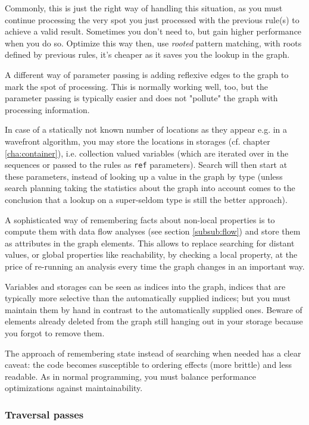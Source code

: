Commonly, this is just the right way of handling this situation, 
as you must continue processing the very spot you just processed with the previous rule(s) to achieve a valid result.
Sometimes you don't need to, but gain higher performance when you do so.
Optimize this way then, use \emph{rooted} pattern matching, with roots defined by previous rules, it's cheaper as it saves you the lookup in the graph.

A different way of parameter passing is adding reflexive edges to the graph to mark the spot of processing.
This is normally working well, too, but the parameter passing is typically easier and does not "pollute" the graph with processing information.

In case of a statically not known number of locations as they appear e.g. in a wavefront algorithm, you may store the locations in storages (cf. chapter \ref{cha:container}), i.e. collection valued variables (which are iterated over in the sequences or passed to the rules as \texttt{ref} parameters).
Search will then start at these parameters, instead of looking up a value in the graph by type (unless search planning taking the statistics about the graph into account comes to the conclusion that a lookup on a super-seldom type is still the better approach).

A sophisticated way of remembering facts about non-local properties is to compute them with data flow analyses (see section \ref{subsub:flow}) and store them as attributes in the graph elements.
This allows to replace searching for distant values, or global properties like reachability, by checking a local property, at the price of re-running an analysis every time the graph changes in an important way.

Variables and storages can be seen as indices into the graph, indices that are typically more selective than the automatically supplied indices; 
but you must maintain them by hand in contrast to the automatically supplied ones.
Beware of elements already deleted from the graph still hanging out in your storage because you forgot to remove them.

The approach of remembering state instead of searching when needed has a clear caveat: the code becomes susceptible to ordering effects (more brittle) and less readable. 
As in normal programming, you must balance performance optimizations against maintainability.

\subsubsection*{Traversal passes}


